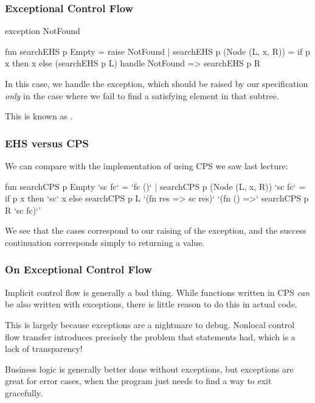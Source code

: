 \documentclass[aspectratio=169]{beamer}
\begin{document}
\begin{frame}[fragile]
  \frametitle{Exceptional Control Flow}
  \begin{codeblock}
    exception NotFound

    fun searchEHS p Empty = raise NotFound
      | searchEHS p (Node (L, x, R)) =
          if p x then
            x
          else
            (searchEHS p L) handle NotFound => searchEHS p R
  \end{codeblock}

  \pause
  \vspace{\fill}

  In this case, we handle the  exception, which should be raised
  by our specification \textit{only} in the case where we fail to find a
  satisfying element in that subtree.

  \pause
  \vspace{\fill}

  This is known as .
\end{frame}

\begin{frame}[fragile]
  \frametitle{EHS versus CPS}

  We can compare with the implementation of  using CPS we saw last lecture:

  \vspace{\fill}

  \begin{codeblock}
    fun searchCPS p Empty `sc fc` = `fc ()`
      | searchCPS p (Node (L, x, R)) `sc fc` =
          if p x then
            `sc` x
          else
            searchCPS p L
              `(fn res => sc res)`
              `(fn () =>` searchCPS p R `sc fc)`'
  \end{codeblock}

  \pause
  \vspace{\fill}

  We see that the  cases correspond to our raising of the  exception,
  and the success continuation corresponds simply to returning a value.

\end{frame}

\begin{frame}[fragile]
  \frametitle{On Exceptional Control Flow}

  Implicit control flow is generally a bad thing. While functions written in
  CPS \textit{can} be also written with exceptions, there is little reason to
  do this in actual code.

  \pause
  \vspace{\fill}

  This is largely because exceptions are a nightmare to debug. Nonlocal control
  flow transfer introduces precisely the problem that  statements
  had, which is a lack of transparency!

  \pause
  \vspace{\fill}

  Business logic is generally better done without exceptions, but exceptions are
  great for error cases, when the program just needs to find a way to exit
  gracefully.
\end{frame}
\end{document}
